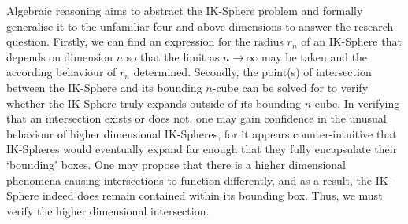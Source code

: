 \noindent Algebraic reasoning aims to abstract the IK-Sphere problem and formally generalise it to the unfamiliar four and above dimensions to answer the research question. Firstly, we can find an expression for the radius $r_n$ of an IK-Sphere that depends on dimension $n$ so that the limit as $n \to \infty$ may be taken and the according behaviour of $r_n$ determined. Secondly, the point(s) of intersection between the IK-Sphere and its bounding $n$-cube can be solved for to verify whether the IK-Sphere truly expands outside of its bounding $n$-cube. In verifying that an intersection exists or does not, one may gain confidence in the unusual behaviour of higher dimensional IK-Spheres, for it appears counter-intuitive that IK-Spheres would eventually expand far enough that they fully encapsulate their `bounding' boxes. One may propose that there is a higher dimensional phenomena causing intersections to function differently, and as a result, the IK-Sphere indeed does remain contained within its bounding box. Thus, we must verify the higher dimensional intersection.
 
